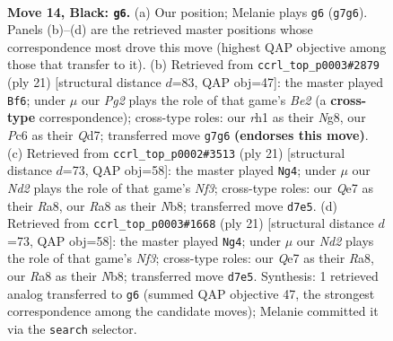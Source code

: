\documentclass[11pt]{article}
\begin{document}
\clearpage

\begin{figure}[p]\centering
\begin{subfigure}{0.46\textwidth}\centering
\resizebox{\linewidth}{!}{%
\newchessgame
\chessboard[
  setfen={rnb1r2k/p2nq1pp/1pp1p3/3pP3/8/2N5/PPPQ1PPP/2K1RBNR b - - 0 14},
  showmover=false,
  pgfstyle=straightmove, color=movearrow, markmove={g7-g6}
]}
\caption{}
\end{subfigure}\hfill
\begin{subfigure}{0.46\textwidth}\centering
\resizebox{\linewidth}{!}{%
\newchessgame
\chessboard[
  setfen={r3k1nr/pppqb1pp/2npp3/8/4P3/3QBN2/PPP2PPP/RN3RK1 b kq - 9 11},
  showmover=false,
  pgfstyle=straightmove, color=movearrow, markmove={e7-f6}
]}
\caption{}
\end{subfigure}
\\[4pt]
\begin{subfigure}{0.46\textwidth}\centering
\resizebox{\linewidth}{!}{%
\newchessgame
\chessboard[
  setfen={rn1q1rk1/1p2b1pp/p2ppn2/4p3/N3P3/4BN2/PPP2PPP/R2Q1RK1 b - - 1 11},
  showmover=false,
  pgfstyle=straightmove, color=movearrow, markmove={f6-g4}
]}
\caption{}
\end{subfigure}\hfill
\begin{subfigure}{0.46\textwidth}\centering
\resizebox{\linewidth}{!}{%
\newchessgame
\chessboard[
  setfen={rn1q1rk1/1p2b1pp/p2ppn2/4p3/N3P3/4BN2/PPP2PPP/R2Q1RK1 b - - 1 11},
  showmover=false,
  pgfstyle=straightmove, color=movearrow, markmove={f6-g4}
]}
\caption{}
\end{subfigure}
\caption{\textbf{Move 14, Black: \texttt{g6}.} (a) Our position; Melanie plays \texttt{g6} (\texttt{g7g6}). Panels (b)--(d) are the retrieved master positions whose correspondence most drove this move (highest QAP objective among those that transfer to it). (b) Retrieved from \texttt{ccrl\_top\_p0003\#2879} (ply 21) [structural distance $d$=83, QAP obj=47]: the master played \texttt{Bf6}; under $\mu$ our \emph{Pg2} plays the role of that game's \emph{Be2} (a \textbf{cross-type} correspondence); cross-type roles: our \emph{r}h1 as their \emph{N}g8, our \emph{P}c6 as their \emph{Q}d7; transferred move \texttt{g7g6} \textbf{(endorses this move)}. (c) Retrieved from \texttt{ccrl\_top\_p0002\#3513} (ply 21) [structural distance $d$=73, QAP obj=58]: the master played \texttt{Ng4}; under $\mu$ our \emph{Nd2} plays the role of that game's \emph{Nf3}; cross-type roles: our \emph{Q}e7 as their \emph{R}a8, our \emph{R}a8 as their \emph{N}b8; transferred move \texttt{d7e5}. (d) Retrieved from \texttt{ccrl\_top\_p0003\#1668} (ply 21) [structural distance $d$=73, QAP obj=58]: the master played \texttt{Ng4}; under $\mu$ our \emph{Nd2} plays the role of that game's \emph{Nf3}; cross-type roles: our \emph{Q}e7 as their \emph{R}a8, our \emph{R}a8 as their \emph{N}b8; transferred move \texttt{d7e5}. Synthesis: 1 retrieved analog transferred to \texttt{g6} (summed QAP objective 47, the strongest correspondence among the candidate moves); Melanie committed it via the \texttt{search} selector.}
\label{fig:thought-m27}
\end{figure}
\end{document}
